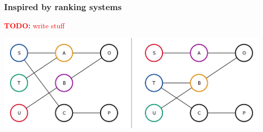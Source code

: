 \documentclass{article}
\theoremstyle{definition} \newtheorem{definition}{Definition}
\theoremstyle{definition} \newtheorem{example}{Example}
\theoremstyle{plain} \newtheorem{axiom}{Axiom}
\theoremstyle{plain} \newtheorem*{remark}{Remark}
\theoremstyle{remark} \newtheorem*{notation}{Notation}
\theoremstyle{plain} \newtheorem{lemma}{Lemma}
\theoremstyle{plain} \newtheorem{proposition}{Proposition}
\newcommand{\todo}[1] {
    \textcolor{red}{
        \textbf{TODO:} #1
    }
}
\begin{document}
\subsubsection{Inspired by ranking systems}
\todo{write stuff}

{
    \centering
    \includegraphics[width=\linewidth]{symmetry_example}
    \label{img:permutation_of_a_tdn}
}

{}


\end{document}
